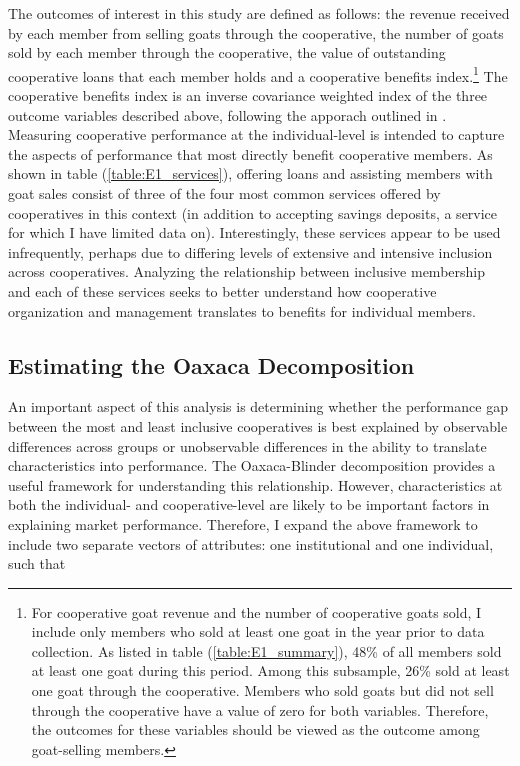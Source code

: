 \documentclass[11pt]{article}
\begin{document}

The outcomes of interest in this study are defined as follows: the revenue received by each member from selling goats through the cooperative, the number of goats sold by each member through the cooperative, the value of outstanding cooperative loans that each member holds and a cooperative benefits index.\footnote{For cooperative goat revenue and the number of cooperative goats sold, I include only members who sold at least one goat in the year prior to data collection. As listed in table (\ref{table:E1_summary}), 48\% of all members sold at least one goat during this period. Among this subsample, 26\% sold at least one goat through the cooperative. Members who sold goats but did not sell through the cooperative have a value of zero for both variables. Therefore, the outcomes for these variables should be viewed as the outcome among goat-selling members.} The cooperative benefits index is an inverse covariance weighted index of the three outcome variables described above, following the apporach outlined in \citet{anderson_multiple_2008}. Measuring cooperative performance at the individual-level is intended to capture the aspects of performance that most directly benefit cooperative members. As shown in table (\ref{table:E1_services}), offering loans and assisting members with goat sales consist of three of the four most common services offered by cooperatives in this context (in addition to accepting savings deposits, a service for which I have limited data on). Interestingly, these services appear to be used infrequently, perhaps due to differing levels of extensive and intensive inclusion across cooperatives. Analyzing the relationship between inclusive membership and each of these services seeks to better understand how cooperative organization and management translates to benefits for individual members. 


\subsection{Estimating the Oaxaca Decomposition} \label{sec:E1_est}

An important aspect of this analysis is determining whether the performance gap between the most and least inclusive cooperatives is best explained by observable differences across groups or unobservable differences in the ability to translate characteristics into performance. The Oaxaca-Blinder decomposition provides a useful framework for understanding this relationship. However, characteristics at both the individual- and cooperative-level are likely to be important factors in explaining market performance. Therefore, I expand the above framework to include two separate vectors of attributes: one institutional and one individual, such that
\end{document}
